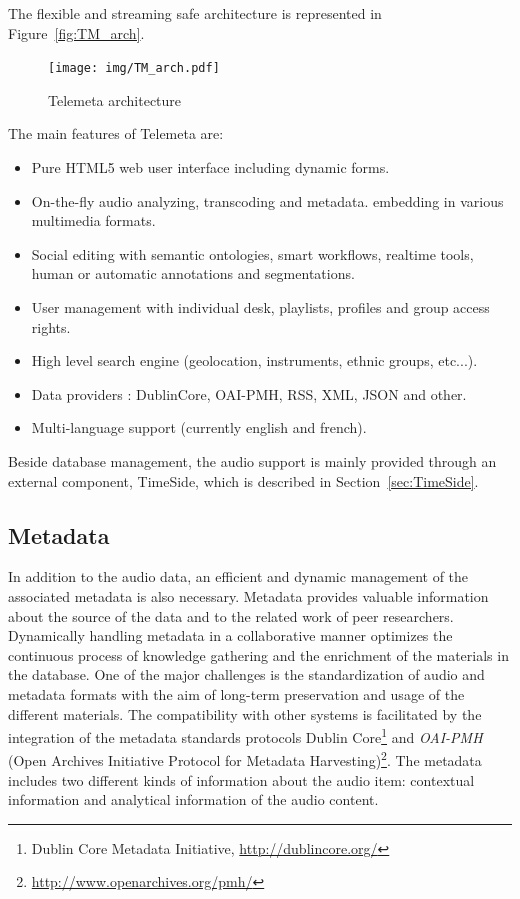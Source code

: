 \documentclass{sig-alternate}
\begin{document}
The flexible and streaming safe architecture is represented in Figure~\ref{fig:TM_arch}.
\begin{figure}[htb]
  \centering
  \texttt{[image: img/TM\_arch.pdf]}
  \caption{Telemeta architecture}\label{fig:TM_arch}
  \label{fig:screenshot}
\end{figure}
The main features of Telemeta are:
      \begin{itemize}
      \item Pure HTML5 web user interface including dynamic forms.
      \item On-the-fly audio analyzing, transcoding and metadata.
        embedding in various multimedia formats.
      \item Social editing with semantic ontologies, smart workflows,
        realtime tools, human or automatic annotations and
        segmentations.
      \item User management with individual desk, playlists, profiles
        and group access rights.
      \item High level search engine (geolocation, instruments, ethnic groups, etc...).
      \item Data providers : DublinCore, OAI-PMH, RSS, XML, JSON and other.
      \item Multi-language support (currently english and french).
      \end{itemize}
Beside database management, the audio support is mainly provided through an external component, TimeSide, which is described in Section~\ref{sec:TimeSide}.
\subsection{Metadata}\label{sec:metadata}
In addition to the audio data, an efficient and dynamic management of the associated metadata is also necessary. Metadata provides valuable information about the source of the data and to the related work of peer researchers. 
Dynamically handling metadata in a collaborative manner optimizes the continuous process of knowledge gathering and the enrichment of the materials in the database.  
One of the major challenges is the standardization of audio and metadata formats with the aim of long-term preservation and usage of the different materials.
The compatibility with other systems is facilitated by the integration of the metadata standards protocols Dublin Core\footnote{{Dublin Core} Metadata Initiative, \url{http://dublincore.org/}} and \emph{OAI-PMH} (Open Archives Initiative Protocol for Metadata Harvesting)\footnote{\url{http://www.openarchives.org/pmh/}}.
The metadata includes two different kinds of information about the audio item: contextual information and analytical information of the audio content.
\end{document}
